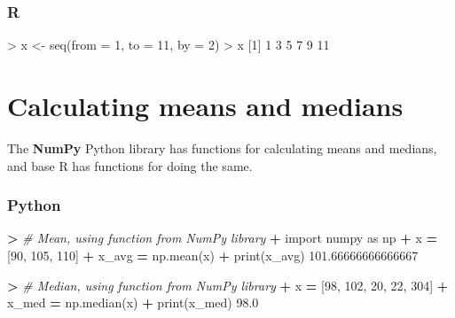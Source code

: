 \documentclass[
]{book}
\newenvironment{Shaded}{\begin{snugshade}}{\end{snugshade}}
\newcommand{\AttributeTok}[1]{\textcolor[rgb]{0.77,0.63,0.00}{#1}}
\newcommand{\BuiltInTok}[1]{#1}
\newcommand{\CommentTok}[1]{\textcolor[rgb]{0.56,0.35,0.01}{\textit{#1}}}
\newcommand{\DecValTok}[1]{\textcolor[rgb]{0.00,0.00,0.81}{#1}}
\newcommand{\FloatTok}[1]{\textcolor[rgb]{0.00,0.00,0.81}{#1}}
\newcommand{\FunctionTok}[1]{\textcolor[rgb]{0.00,0.00,0.00}{#1}}
\newcommand{\ImportTok}[1]{#1}
\newcommand{\NormalTok}[1]{#1}
\newcommand{\OperatorTok}[1]{\textcolor[rgb]{0.81,0.36,0.00}{\textbf{#1}}}
\newcommand{\OtherTok}[1]{\textcolor[rgb]{0.56,0.35,0.01}{#1}}
\newcommand{\SpecialCharTok}[1]{\textcolor[rgb]{0.00,0.00,0.00}{#1}}
\begin{document}
\hypertarget{r-5}{%
\subsubsection*{R}\label{r-5}}

\begin{Shaded}
\begin{Highlighting}[]
\SpecialCharTok{\textgreater{}}\NormalTok{ x }\OtherTok{\textless{}{-}} \FunctionTok{seq}\NormalTok{(}\AttributeTok{from =} \DecValTok{1}\NormalTok{, }\AttributeTok{to =} \DecValTok{11}\NormalTok{, }\AttributeTok{by =} \DecValTok{2}\NormalTok{)}
\SpecialCharTok{\textgreater{}}\NormalTok{ x}
\NormalTok{[}\DecValTok{1}\NormalTok{]  }\DecValTok{1}  \DecValTok{3}  \DecValTok{5}  \DecValTok{7}  \DecValTok{9} \DecValTok{11}
\end{Highlighting}
\end{Shaded}

\hypertarget{calculating-means-and-medians}{%
\section{Calculating means and medians}\label{calculating-means-and-medians}}

The \textbf{NumPy} Python library has functions for calculating means and medians, and base R has functions for doing the same.

\hypertarget{python-6}{%
\subsubsection*{Python}\label{python-6}}

\begin{Shaded}
\begin{Highlighting}[]
\OperatorTok{\textgreater{}} \CommentTok{\# Mean, using function from NumPy library}
\OperatorTok{+} \ImportTok{import}\NormalTok{ numpy }\ImportTok{as}\NormalTok{ np}
\OperatorTok{+}\NormalTok{ x }\OperatorTok{=}\NormalTok{ [}\DecValTok{90}\NormalTok{, }\DecValTok{105}\NormalTok{, }\DecValTok{110}\NormalTok{]}
\OperatorTok{+}\NormalTok{ x\_avg }\OperatorTok{=}\NormalTok{ np.mean(x)}
\OperatorTok{+} \BuiltInTok{print}\NormalTok{(x\_avg)}
\FloatTok{101.66666666666667}
\end{Highlighting}
\end{Shaded}

\begin{Shaded}
\begin{Highlighting}[]
\OperatorTok{\textgreater{}} \CommentTok{\# Median, using function from NumPy library}
\OperatorTok{+}\NormalTok{ x }\OperatorTok{=}\NormalTok{ [}\DecValTok{98}\NormalTok{, }\DecValTok{102}\NormalTok{, }\DecValTok{20}\NormalTok{, }\DecValTok{22}\NormalTok{, }\DecValTok{304}\NormalTok{]}
\OperatorTok{+}\NormalTok{ x\_med }\OperatorTok{=}\NormalTok{ np.median(x)}
\OperatorTok{+} \BuiltInTok{print}\NormalTok{(x\_med)}
\FloatTok{98.0}
\end{Highlighting}
\end{Shaded}
\end{document}

